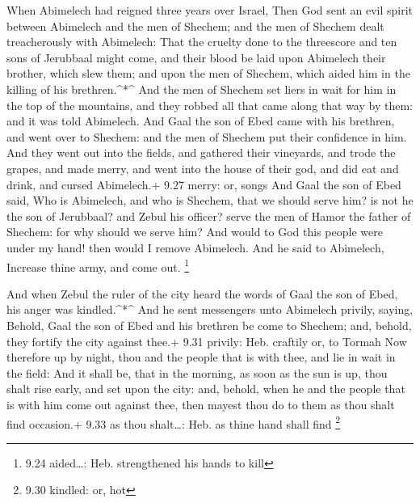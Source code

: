  When Abimelech had reigned three years over Israel,
 Then God sent an evil spirit between Abimelech and the men
of Shechem; and the men of Shechem dealt treacherously with Abimelech:
 That the cruelty done to the threescore and ten sons of
Jerubbaal might come, and their blood be laid upon Abimelech their
brother, which slew them; and upon the men of Shechem, which aided him
in the killing of his brethren.\^{}*\^{}  And the men of
Shechem set liers in wait for him in the top of the mountains, and they
robbed all that came along that way by them: and it was told Abimelech.
 And Gaal the son of Ebed came with his brethren, and went
over to Shechem: and the men of Shechem put their confidence in him.
 And they went out into the fields, and gathered their
vineyards, and trode the grapes, and made merry, and went into the house
of their god, and did eat and drink, and cursed Abimelech.+ 9.27 merry:
or, songs  And Gaal the son of Ebed said, Who is Abimelech,
and who is Shechem, that we should serve him? is not he the son of
Jerubbaal? and Zebul his officer? serve the men of Hamor the father of
Shechem: for why should we serve him?  And would to God
this people were under my hand! then would I remove Abimelech. And he
said to Abimelech, Increase thine army, and come out. \footnote{9.24
  aided\ldots: Heb. strengthened his hands to kill}

 And when Zebul the ruler of the city heard the words of
Gaal the son of Ebed, his anger was kindled.\^{}*\^{}  And
he sent messengers unto Abimelech privily, saying, Behold, Gaal the son
of Ebed and his brethren be come to Shechem; and, behold, they fortify
the city against thee.+ 9.31 privily: Heb. craftily or, to Tormah
 Now therefore up by night, thou and the people that is
with thee, and lie in wait in the field:  And it shall be,
that in the morning, as soon as the sun is up, thou shalt rise early,
and set upon the city: and, behold, when he and the people that is with
him come out against thee, then mayest thou do to them as thou shalt
find occasion.+ 9.33 as thou shalt\ldots: Heb. as thine hand shall find
\footnote{9.30 kindled: or, hot}

